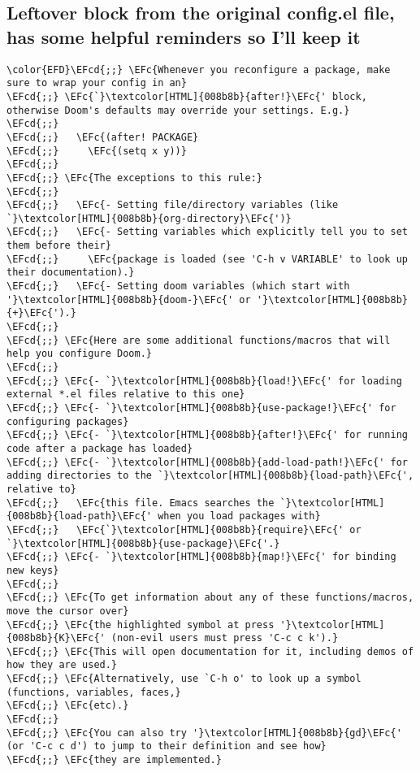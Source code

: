 \documentclass{article}
\newcommand{\EFc}[1]{\textcolor{EFc}{#1}} %
\newcommand{\EFcd}[1]{\textcolor{EFcd}{#1}} %
\begin{document}
\subsection{Leftover block from the original config.el file, has some helpful reminders so I'll keep it}
\label{sec:org8d18000}
\begin{Code}
\begin{Verbatim}
\color{EFD}\EFcd{;;} \EFc{Whenever you reconfigure a package, make sure to wrap your config in an}
\EFcd{;;} \EFc{`}\textcolor[HTML]{008b8b}{after!}\EFc{' block, otherwise Doom's defaults may override your settings. E.g.}
\EFcd{;;}
\EFcd{;;}   \EFc{(after! PACKAGE}
\EFcd{;;}     \EFc{(setq x y))}
\EFcd{;;}
\EFcd{;;} \EFc{The exceptions to this rule:}
\EFcd{;;}
\EFcd{;;}   \EFc{- Setting file/directory variables (like `}\textcolor[HTML]{008b8b}{org-directory}\EFc{')}
\EFcd{;;}   \EFc{- Setting variables which explicitly tell you to set them before their}
\EFcd{;;}     \EFc{package is loaded (see 'C-h v VARIABLE' to look up their documentation).}
\EFcd{;;}   \EFc{- Setting doom variables (which start with '}\textcolor[HTML]{008b8b}{doom-}\EFc{' or '}\textcolor[HTML]{008b8b}{+}\EFc{').}
\EFcd{;;}
\EFcd{;;} \EFc{Here are some additional functions/macros that will help you configure Doom.}
\EFcd{;;}
\EFcd{;;} \EFc{- `}\textcolor[HTML]{008b8b}{load!}\EFc{' for loading external *.el files relative to this one}
\EFcd{;;} \EFc{- `}\textcolor[HTML]{008b8b}{use-package!}\EFc{' for configuring packages}
\EFcd{;;} \EFc{- `}\textcolor[HTML]{008b8b}{after!}\EFc{' for running code after a package has loaded}
\EFcd{;;} \EFc{- `}\textcolor[HTML]{008b8b}{add-load-path!}\EFc{' for adding directories to the `}\textcolor[HTML]{008b8b}{load-path}\EFc{', relative to}
\EFcd{;;}   \EFc{this file. Emacs searches the `}\textcolor[HTML]{008b8b}{load-path}\EFc{' when you load packages with}
\EFcd{;;}   \EFc{`}\textcolor[HTML]{008b8b}{require}\EFc{' or `}\textcolor[HTML]{008b8b}{use-package}\EFc{'.}
\EFcd{;;} \EFc{- `}\textcolor[HTML]{008b8b}{map!}\EFc{' for binding new keys}
\EFcd{;;}
\EFcd{;;} \EFc{To get information about any of these functions/macros, move the cursor over}
\EFcd{;;} \EFc{the highlighted symbol at press '}\textcolor[HTML]{008b8b}{K}\EFc{' (non-evil users must press 'C-c c k').}
\EFcd{;;} \EFc{This will open documentation for it, including demos of how they are used.}
\EFcd{;;} \EFc{Alternatively, use `C-h o' to look up a symbol (functions, variables, faces,}
\EFcd{;;} \EFc{etc).}
\EFcd{;;}
\EFcd{;;} \EFc{You can also try '}\textcolor[HTML]{008b8b}{gd}\EFc{' (or 'C-c c d') to jump to their definition and see how}
\EFcd{;;} \EFc{they are implemented.}
\end{Verbatim}
\end{Code}
\end{document}
